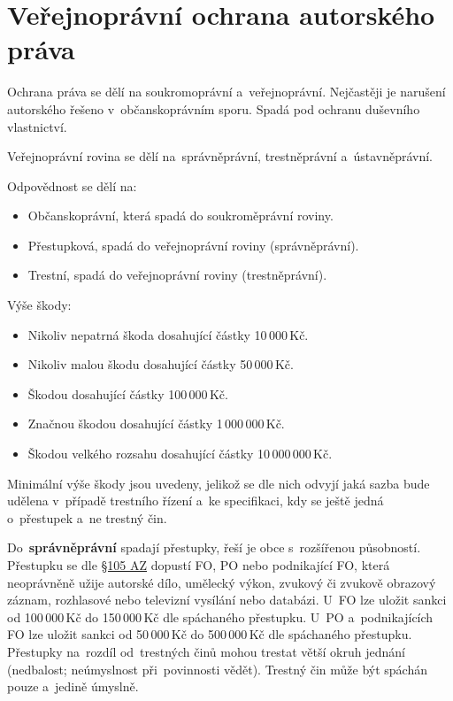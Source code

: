 \section{Veřejnoprávní ochrana autorského práva}

Ochrana práva se dělí na soukromoprávní a~veřejnoprávní. Nejčastěji je narušení autorského řešeno v~občanskoprávním sporu. Spadá pod ochranu duševního vlastnictví.

Veřejnoprávní rovina se dělí na~správněprávní, trestněprávní a~ústavněprávní.

Odpovědnost se dělí na:
\vspace{-0,2cm}
\begin{itemize}[noitemsep]
    \item Občanskoprávní, která spadá do soukroměprávní roviny.
    \item Přestupková, spadá do veřejnoprávní roviny (správněprávní).
    \item Trestní, spadá do veřejnoprávní roviny (trestněprávní).
\end{itemize}

Výše škody:
\vspace{-0,1cm}
\begin{itemize}[noitemsep]
    \item Nikoliv nepatrná škoda dosahující částky 10\,000\,Kč.
    \item Nikoliv malou škodu dosahující částky 50\,000\,Kč.
    \item Škodou dosahující částky 100\,000\,Kč.
    \item Značnou škodou dosahující částky 1\,000\,000\,Kč.
    \item Škodou velkého rozsahu dosahující částky 10\,000\,000\,Kč.
\end{itemize}

Minimální výše škody jsou uvedeny, jelikož se dle nich odvyjí jaká sazba bude udělena v~případě trestního řízení a~ke specifikaci, kdy se ještě jedná o~přestupek a~ne trestný čin.

Do~\textbf{správněprávní} spadají přestupky, řeší je obce s~rozšířenou působností. Přestupku se dle 
\href{https://www.zakonyprolidi.cz/cs/2000-121#p105a-1-a}{§105 AZ} dopustí FO, PO nebo podnikající FO, která neoprávněně užije autorské dílo, umělecký výkon, zvukový či zvukově obrazový záznam, rozhlasové nebo televizní vysílání nebo databázi. U~FO lze uložit sankci od 100\,000\,Kč do 150\,000\,Kč dle spáchaného přestupku. U~PO a~podnikajících FO lze uložit sankci od 50\,000\,Kč do 500\,000\,Kč dle spáchaného přestupku.
Přestupky na~rozdíl od~trestných činů mohou trestat větší okruh jednání (nedbalost; neúmyslnost při~povinnosti vědět). Trestný čin může být spáchán pouze a~jedině úmyslně. 

